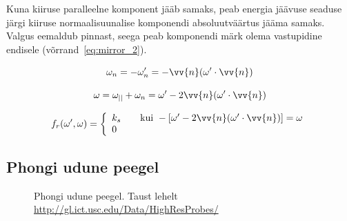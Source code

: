 \documentclass[a4paper,12pt]{report}
\renewcommand{\vec}[1]{\vv{#1}}
\begin{document}
Kuna kiiruse paralleelne komponent jääb samaks, peab energia jäävuse
seaduse järgi kiiruse normaalisuunalise komponendi absoluutväärtus jääma
samaks. Valgus eemaldub pinnast, seega peab komponendi märk olema vastupidine
endisele (võrrand~\ref{eq:mirror_2}).

\begin{equation} \label{eq:mirror_2}
\omega_n = -\omega'_n = -\vec n(\omega'\cdot\vec n)
\end{equation}

\begin{minipage}{0.5\textwidth}
\[\omega = \omega_{||} + \omega_n = \omega' - 2\vec n(\omega'\cdot\vec n)\]
\end{minipage}

\[f_r(\omega', \omega) = \left\{\begin{array}{l l} k_s & \quad \text{kui} ~ -[\omega'-2\vec n(\omega'\cdot\vec n)] = \omega \\ 0 \end{array} \right. \]

\subsection{Phongi udune peegel}
\label{subsec:phong}
\begin{figure}[h]
\centering
{}
\caption[Phongi udune peegel]{Phongi udune peegel. Taust lehelt \url{http://gl.ict.usc.edu/Data/HighResProbes/}}
\label{fig:phong}
\vspace{100pt}
\end{figure}
\end{document}
